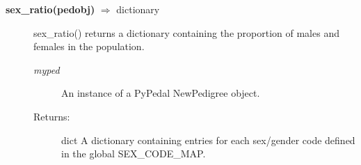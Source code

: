 \begin{description}
\item[\textbf{sex\_ratio(pedobj)} $\Rightarrow$ dictionary]
sex\_ratio() returns a dictionary containing the proportion of males and females in the population.
\begin{description}
\item[\emph{myped}] An instance of a PyPedal NewPedigree object.
\item[Returns:] dict A dictionary containing entries for each sex/gender code defined in the global SEX\_CODE\_MAP.
\end{description}

\end{description}